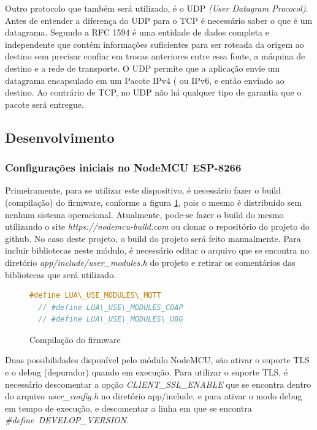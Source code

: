 \documentclass[journal]{IEEEtran}
\begin{document}
Outro protocolo que também será utilizado, é o UDP \emph{(User Datagram Prococol)}. Antes de entender a diferença do UDP para o TCP é necessário saber o que é um datagrama. Segundo a RFC 1594 \cite{rfc1594} é uma entidade de dados completa e independente que contém informações suficientes para ser roteada da origem ao destino sem precisar confiar em trocas anteriores entre essa fonte, a máquina de destino e a rede de transporte. O UDP permite que a aplicação envie um datagrama encapsulado em um Pacote IPv4 ( ou IPv6, e então enviado ao destino. Ao contrário de TCP, no UDP não há qualquer tipo de garantia que o pacote será entregue.



\subsection{Desenvolvimento}
\subsubsection{Configurações iniciais no NodeMCU ESP-8266}
Primeiramente, para se utilizar este dispositivo, é necessário fazer o build (compilação) do firmware, conforme a figura \ref{alg:modulesh}, pois o mesmo é distribuido sem nenhum sistema operacional. Atualmente, pode-se fazer o build do mesmo utilizando o site \emph{https://nodemcu-build.com} ou clonar o repositório do projeto do github. No caso deste projeto, o build do projeto será feito manualmente. Para incluir bibliotecas neste módulo, é necessário editar o arquivo que se encontra no diretório \emph{app/include/user\_modules.h} do projeto e retirar os comentários das bibliotecas que será utilizado.

\begin{figure}[h]
\centering

\begin{lstlisting}[language=C]
  #define LUA\_USE_MODULES\_MQTT
  // #define LUA\_USE\_MODULES_COAP
  // #define LUA\_USE\_MODULES\_U8G
\end{lstlisting}

\caption{Compilação do firmware}
\label{alg:modulesh}
\end{figure}

Duas possibilidades disponível pelo módulo NodeMCU, são ativar o suporte TLS e o debug (depurador) quando em execução. Para utilizar o suporte TLS, é necessário descomentar a opção \emph{CLIENT\_SSL\_ENABLE} que se encontra dentro do arquivo \emph{user\_config.h} no diretório app/include, e para ativar o modo debug em tempo de execução, e descomentar a linha em que se encontra \emph{\#define\ DEVELOP\_VERSION}.
\end{document}

